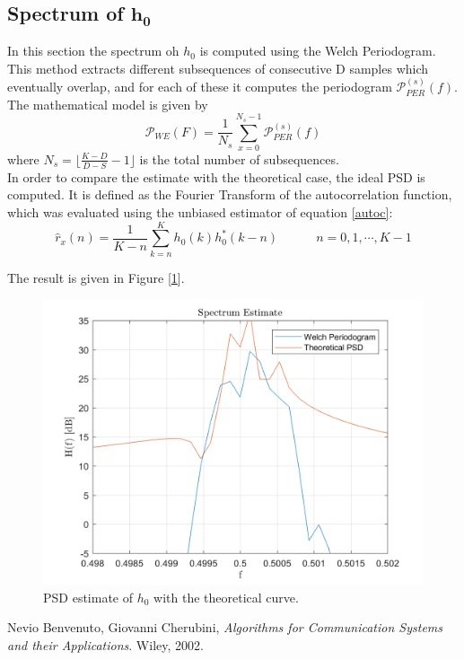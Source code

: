 \documentclass[a4paper, 12pt]{report}
\begin{document}
\clearpage
\subsection*{Spectrum of $\mathbf{h_0}$}
In this section the spectrum oh $h_0$ is computed using the Welch Periodogram. This method extracts different subsequences of consecutive D samples which eventually overlap, and for each of these it computes the periodogram $\mathcal{P}_{PER}^{\left(s\right)}(f)$. The mathematical model is given by
\begin{equation*}
\mathcal{P}_{WE}(F) = \frac{1}{N_s}\sum_{x=0}^{N_s-1}\mathcal{P}_{PER}^{(s)}(f)
\end{equation*}
where $N_s = \lfloor \frac{K-D}{D-S}-1 \rfloor$ is the total number of subsequences. \\
In order to compare the estimate with the theoretical case, the ideal PSD is computed. It is defined as the Fourier Transform of the autocorrelation function, which was evaluated using the unbiased estimator of equation \ref{autoc}:
\begin{equation}\label{autoc}
\hat{r}_x(n) = \frac{1}{K-n}\sum_{k=n}^Kh_0(k)h_0^*(k-n)  \quad\quad\quad n=0,1,\cdots,K-1
\end{equation}

The result is given in Figure [\ref{Welch}].
\begin{figure}[H]
	\centering
	\includegraphics[width=14cm]{images/Welch}
	\caption{PSD estimate of $h_0$ with the theoretical curve.}\label{Welch}
\end{figure}


\begin{thebibliography}{15}
	Nevio Benvenuto, Giovanni Cherubini,
	\textit{Algorithms for Communication Systems and their Applications}. 
	Wiley, 2002.
\end{thebibliography}
\end{document}
